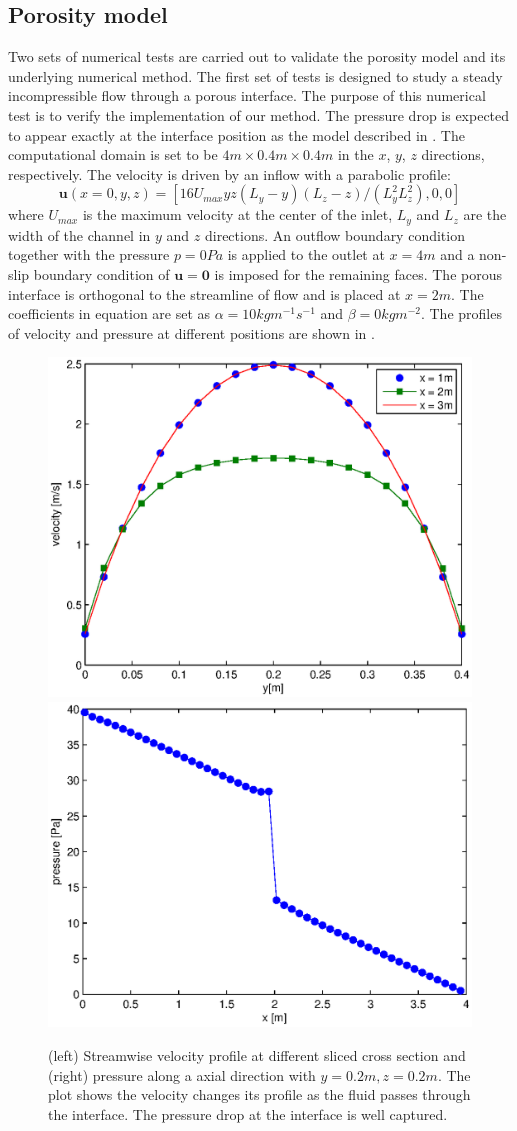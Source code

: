 \subsection{Porosity model}
Two sets of numerical tests are carried out to validate the porosity model 
and its underlying numerical method. 
The first set of tests is designed to study a steady incompressible flow
through a porous interface. The purpose of this numerical test is to 
verify the implementation of our method. The pressure drop is expected to appear exactly 
at the interface position as the model described in . 
The computational domain is set to be $4 m\times
0.4 m\times 0.4 m$ in the $x$, $y$, $z$ directions, respectively. The velocity is
driven by an inflow with a parabolic profile: 
\begin{equation}
\mathbf{u}(x=0,y,z) = [16U_{max}yz(L_y - y)(L_z - z)/(L^2_yL^2_z),0,0]
\end{equation} 
where $U_{max}$ is the maximum velocity at the center of the
inlet, $L_y$ and $L_z$ are the width of the channel in $y$ and $z$ directions. 
An outflow boundary condition together with the pressure $p = 0 Pa$ is applied to 
the outlet at $x = 4 m$ and a non-slip boundary condition of $\mathbf{u} = \mathbf{0}$ 
is imposed for the remaining faces. The porous interface is orthogonal to the streamline 
of flow and is placed at $x = 2m$. The coefficients in equation  are set as 
$\alpha = 10 kgm^{-1}s^{-1}$ and $\beta = 0 kgm^{-2}$.
The profiles of velocity and pressure at different positions are shown in .  	

\begin{figure}[H] \centering
\includegraphics[width=0.49\columnwidth]{Figures/ucrs_profile}
\includegraphics[width=0.49\columnwidth]{Figures/p_profile} \caption{(left)
Streamwise velocity profile at different sliced cross section and 
(right) pressure along a axial direction with $y = 0.2 m, z = 0.2 m$. The plot 
shows the velocity changes its profile as the fluid passes through the interface. 
The pressure drop at the interface is well captured.} 
\label{fig:test1_profile} 
\end{figure}

